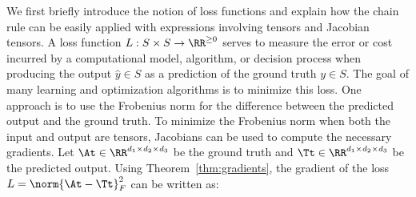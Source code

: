 We first briefly introduce the notion of loss functions and explain how the chain rule can be easily applied with expressions involving tensors and Jacobian tensors. A loss function $L:S\times S\to \RR^{\geq 0}$ serves to measure the error or cost incurred by a computational model, algorithm, or decision process when producing the output $\hat{y}\in S$ as a prediction of the ground truth $y\in S$. The goal of many learning and optimization algorithms is to minimize this loss. One approach is to use the Frobenius norm for the difference between the predicted output and the ground truth. To minimize the Frobenius norm when both the input and output are tensors, Jacobians can be used to compute the necessary gradients. Let $\At\in\RR^{d_1\times d_2\times d_3}$ be the ground truth and $\Tt\in\RR^{d_1\times d_2\times d_3}$ be the predicted output. Using Theorem~\ref{thm:gradients}, the gradient of the loss $L = \norm{\At-\Tt}_F^2$ can be written as:
